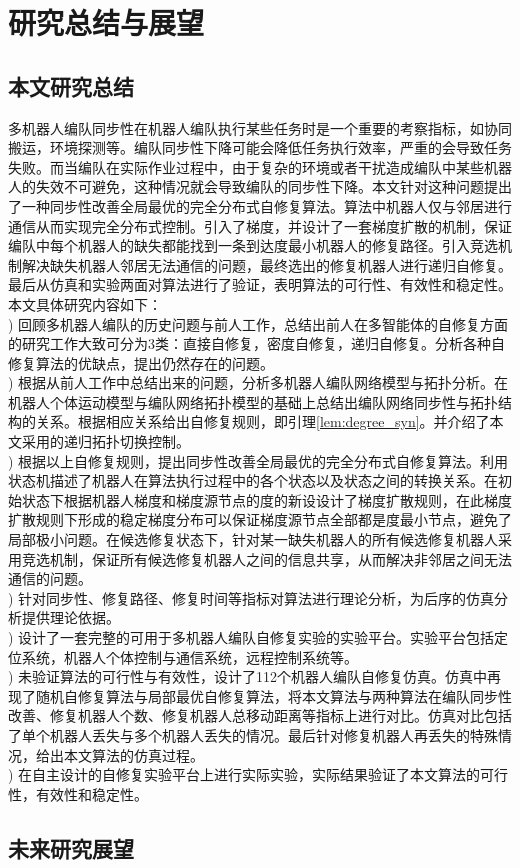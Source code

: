 \chapter{研究总结与展望}

\section{本文研究总结}
多机器人编队同步性在机器人编队执行某些任务时是一个重要的考察指标，如协同搬运，环境探测等。编队同步性下降可能会降低任务执行效率，严重的会导致任务失败。而当编队在实际作业过程中，由于复杂的环境或者干扰造成编队中某些机器人的失效不可避免，这种情况就会导致编队的同步性下降。本文针对这种问题提出了一种同步性改善全局最优的完全分布式自修复算法。算法中机器人仅与邻居进行通信从而实现完全分布式控制。引入了梯度，并设计了一套梯度扩散的机制，保证编队中每个机器人的缺失都能找到一条到达度最小机器人的修复路径。引入竞选机制解决缺失机器人邻居无法通信的问题，最终选出的修复机器人进行递归自修复。最后从仿真和实验两面对算法进行了验证，表明算法的可行性、有效性和稳定性。本文具体研究内容如下：\\
) 回顾多机器人编队的历史问题与前人工作，总结出前人在多智能体的自修复方面的研究工作大致可分为3类：直接自修复，密度自修复，递归自修复。分析各种自修复算法的优缺点，提出仍然存在的问题。\\
) 根据从前人工作中总结出来的问题，分析多机器人编队网络模型与拓扑分析。在机器人个体运动模型与编队网络拓扑模型的基础上总结出编队网络同步性与拓扑结构的关系。根据相应关系给出自修复规则，即引理\ref{lem:degree_syn}。并介绍了本文采用的递归拓扑切换控制。\\
) 根据以上自修复规则，提出同步性改善全局最优的完全分布式自修复算法。利用状态机描述了机器人在算法执行过程中的各个状态以及状态之间的转换关系。在初始状态下根据机器人梯度和梯度源节点的度的新设设计了梯度扩散规则，在此梯度扩散规则下形成的稳定梯度分布可以保证梯度源节点全部都是度最小节点，避免了局部极小问题。在候选修复状态下，针对某一缺失机器人的所有候选修复机器人采用竞选机制，保证所有候选修复机器人之间的信息共享，从而解决非邻居之间无法通信的问题。\\
) 针对同步性、修复路径、修复时间等指标对算法进行理论分析，为后序的仿真分析提供理论依据。\\
) 设计了一套完整的可用于多机器人编队自修复实验的实验平台。实验平台包括定位系统，机器人个体控制与通信系统，远程控制系统等。\\
) 未验证算法的可行性与有效性，设计了112个机器人编队自修复仿真。仿真中再现了随机自修复算法与局部最优自修复算法，将本文算法与两种算法在编队同步性改善、修复机器人个数、修复机器人总移动距离等指标上进行对比。仿真对比包括了单个机器人丢失与多个机器人丢失的情况。最后针对修复机器人再丢失的特殊情况，给出本文算法的仿真过程。\\
) 在自主设计的自修复实验平台上进行实际实验，实际结果验证了本文算法的可行性，有效性和稳定性。

\section{未来研究展望}